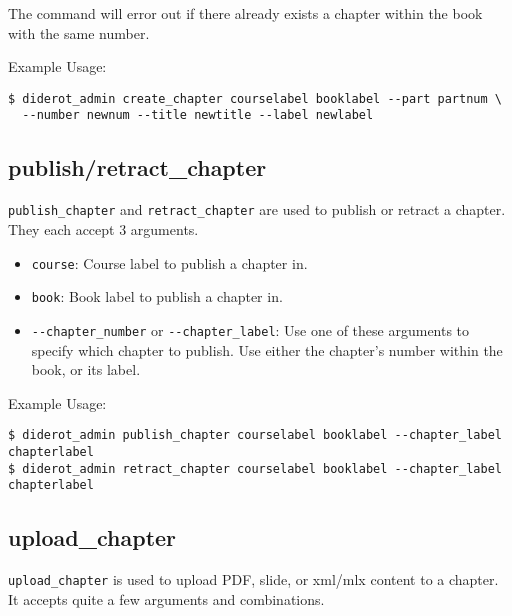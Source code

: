 The command will error out if there already exists a chapter within the book with the same number.

Example Usage:
\begin{verbatim}
$ diderot_admin create_chapter courselabel booklabel --part partnum \
  --number newnum --title newtitle --label newlabel
\end{verbatim}

\subsection{publish/retract\_chapter}

\verb|publish_chapter| and \verb|retract_chapter| are used to publish or retract a chapter. They each accept 3 arguments.

\begin{itemize}
  \item \verb|course|: Course label to publish a chapter in. 
  \item \verb|book|: Book label to publish a chapter in.

  \item \verb|--chapter_number| or \verb|--chapter_label|: Use one of these arguments to specify which chapter to publish. Use either the chapter's number within the book, or its label.
\end{itemize}

Example Usage:
\begin{verbatim}
$ diderot_admin publish_chapter courselabel booklabel --chapter_label chapterlabel
$ diderot_admin retract_chapter courselabel booklabel --chapter_label chapterlabel
\end{verbatim}

\subsection{upload\_chapter}

\verb|upload_chapter| is used to upload PDF, slide, or xml/mlx content to a chapter.
%
It accepts quite a few arguments and combinations.

